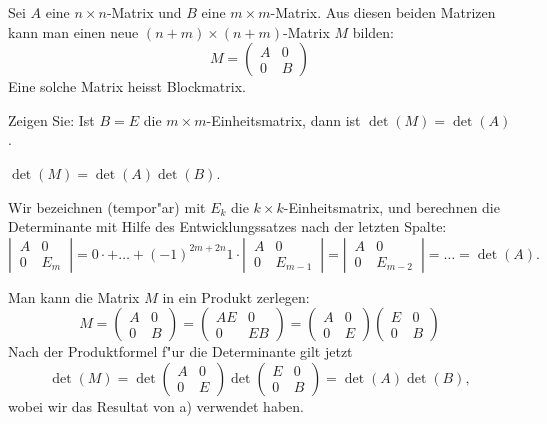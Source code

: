 Sei $A$ eine $n\times n$-Matrix und $B$ eine $m\times m$-Matrix. Aus diesen beiden
Matrizen kann man einen neue $(n+m)\times(n+m)$-Matrix $M$ bilden:
\[
M=\begin{pmatrix}
A&0\\
0&B
\end{pmatrix}
\]
Eine solche Matrix heisst Blockmatrix.
\begin{teilaufgaben}
\item
Zeigen Sie:
Ist $B=E$ die $m\times m$-Einheitsmatrix, dann ist $\det(M)=\det(A)$.
\item
$\det(M)=\det(A)\det(B)$.
\end{teilaufgaben}

\begin{loesung}
\begin{teilaufgaben}
\item Wir bezeichnen (tempor"ar) mit $E_k$ die $k\times k$-Einheitsmatrix,
und berechnen die Determinante mit Hilfe des Entwicklungssatzes nach der
letzten Spalte:
\[
\left|\,
\begin{matrix}
A&0\\
0&E_m
\end{matrix}
\,\right|
=0\cdot +\dots+(-1)^{2m+2n}1\cdot
\left|\,
\begin{matrix}
A&0\\
0&E_{m-1}
\end{matrix}
\,\right|
=
\left|\,
\begin{matrix}
A&0\\
0&E_{m-2}
\end{matrix}
\,\right|
=\dots=
\det(A).
\]

\item
Man kann die Matrix $M$ in ein Produkt zerlegen:
\[
M=
\begin{pmatrix}
A&0\\
0&B
\end{pmatrix}
=
\begin{pmatrix}
AE&0\\
0&EB
\end{pmatrix}
=
\begin{pmatrix}
A&0\\
0&E
\end{pmatrix}
\begin{pmatrix}
E&0\\
0&B
\end{pmatrix}
\]
Nach der Produktformel f"ur die Determinante gilt jetzt
\[
\det(M) =
\det
\begin{pmatrix}
A&0\\
0&E
\end{pmatrix}
\det
\begin{pmatrix}
E&0\\
0&B
\end{pmatrix}
=\det(A)\det(B),
\]
wobei wir das Resultat von a) verwendet haben.
\end{teilaufgaben}
\end{loesung}

